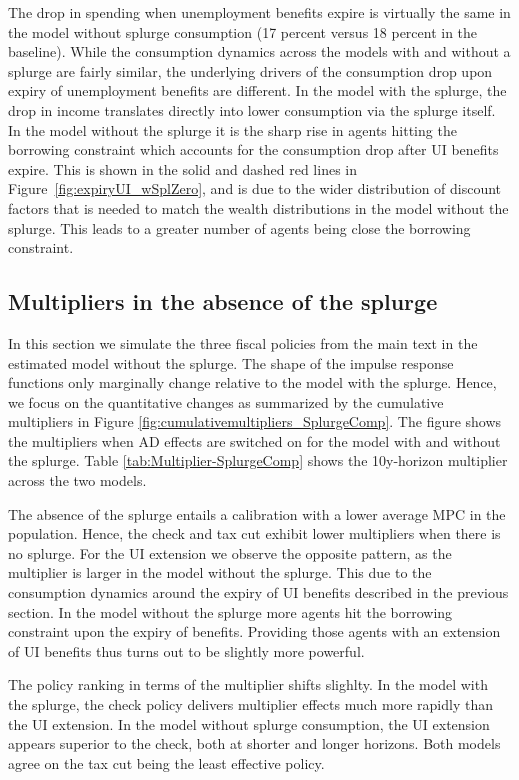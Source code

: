 \documentclass[\PathToRoot/\ProjectName]{subfiles}
\begin{document}
The drop in spending when unemployment benefits expire is virtually the same in the model without splurge consumption (17 percent versus 18 percent in the baseline).
While the consumption dynamics across the models with and without a splurge are fairly similar, the underlying drivers of the consumption drop upon expiry of unemployment benefits are different.
In the model with the splurge, the drop in income translates directly into lower consumption via the splurge itself.
In the model without the splurge it is the sharp rise in agents hitting the borrowing constraint which accounts for the consumption drop after UI benefits expire.
This is shown in the solid and dashed red lines in Figure~\ref{fig:expiryUI_wSplZero}, and is due to the wider distribution of discount factors that is needed to match the wealth distributions in the model without the splurge. This leads to a greater number of agents being close the borrowing constraint.



\subsection{Multipliers in the absence of the splurge}

In this section we simulate the three fiscal policies from the main text in the estimated model without the splurge. The shape of the impulse response functions only marginally change relative to the model with the splurge. Hence, we focus on the quantitative changes as summarized by the cumulative multipliers in Figure \ref{fig:cumulativemultipliers_SplurgeComp}.
The figure shows the multipliers when AD effects are switched on for the model with and without the splurge.
Table \ref{tab:Multiplier-SplurgeComp} shows the 10y-horizon multiplier across the two models.

The absence of the splurge entails a calibration with a lower average MPC in the population.
Hence, the check and tax cut exhibit lower multipliers when there is no splurge.
For the UI extension we observe the opposite pattern, as the multiplier is larger in the model without the splurge.
This due to the consumption dynamics around the expiry of UI benefits described in the previous section.
In the model without the splurge more agents hit the borrowing constraint upon the expiry of benefits.
Providing those agents with an extension of UI benefits thus turns out to be slightly more powerful.

The policy ranking in terms of the multiplier shifts slighlty.
In the model with the splurge, the check policy delivers multiplier effects much more rapidly than the UI extension.
In the model without splurge consumption, the UI extension appears superior to the check, both at shorter and longer horizons.
Both models agree on the tax cut being the least effective policy.





\FloatBarrier

\smartbib
\end{document}
